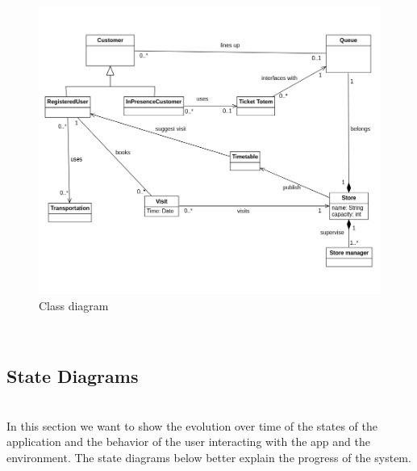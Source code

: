 \documentclass[]{article}
\begin{document}
		\begin{figure}[htp]
			\centering
			\includegraphics[scale=0.5]{UML_class_diagram.png}
			\caption{Class diagram}
			\label{fig:class_diagram}
		\end{figure}
		
	\textbf{}\\
		\subsection{State Diagrams}
		
		\textbf{}\\ \newline
		In this section we want to show the evolution over time of the states of the application and the behavior of the user interacting with the app and the environment. 
The state diagrams below better explain the progress of the system.\\
		
		\textbf{}\\ \newline
		
\end{document}
